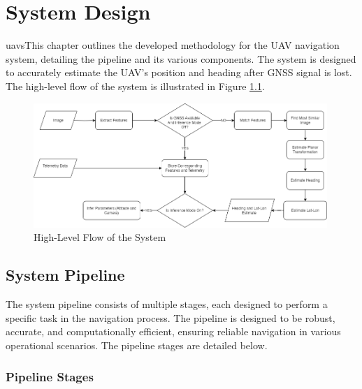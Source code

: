 

\chapter{System Design}
\vspace{-1cm}


uavsThis chapter outlines the developed methodology for the UAV navigation system, detailing the pipeline and its various components. The system is designed to accurately estimate the UAV's position and heading after GNSS signal is lost. The high-level flow of the system is illustrated in Figure \ref{fig:HighLevelFlow}.

\begin{figure}[H]
    \centering
    \includegraphics[width=0.99\textwidth]{Chapter 3/Chap3Figs/HighLevelFlow.png}
    \caption{High-Level Flow of the System}
    \label{fig:HighLevelFlow}
\end{figure}




\section{System Pipeline}
The system pipeline consists of multiple stages, each designed to perform a specific task in the navigation process. The pipeline is designed to be robust, accurate, and computationally efficient, ensuring reliable navigation in various operational scenarios. The pipeline stages are detailed below.

\subsection{Pipeline Stages}

